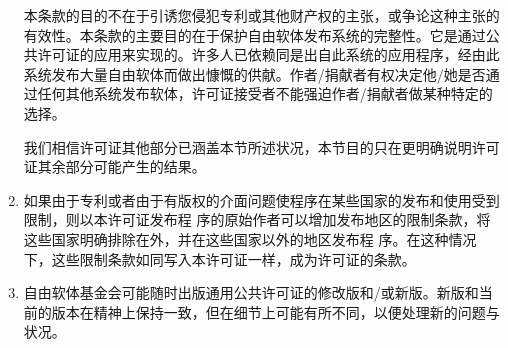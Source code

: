 \begin{enumerate}
        本条款的目的不在于引诱您侵犯专利或其他财产权的主张，或争论这种主张的有效性。本条款的主要目的在于保护自由软体发布系统的完整性。它是通过公共许可证的应用来实现的。许多人已依赖同是出自此系统的应用程序，经由此系统发布大量自由软体而做出慷慨的供献。作者/捐献者有权决定他/她是否通过任何其他系统发布软体，许可证接受者不能强迫作者/捐献者做某种特定的选择。


        我们相信许可证其他部分已涵盖本节所述状况，本节目的只在更明确说明许可证其余部分可能产生的结果。
    \item 如果由于专利或者由于有版权的介面问题使程序在某些国家的发布和使用受到限制，则以本许可证发布程 序的原始作者可以增加发布地区的限制条款，将这些国家明确排除在外，并在这些国家以外的地区发布程 序。在这种情况下，这些限制条款如同写入本许可证一样，成为许可证的条款。
    \item 自由软体基金会可能随时出版通用公共许可证的修改版和/或新版。新版和当前的版本在精神上保持一致，但在细节上可能有所不同，以便处理新的问题与状况。



\end{enumerate}
